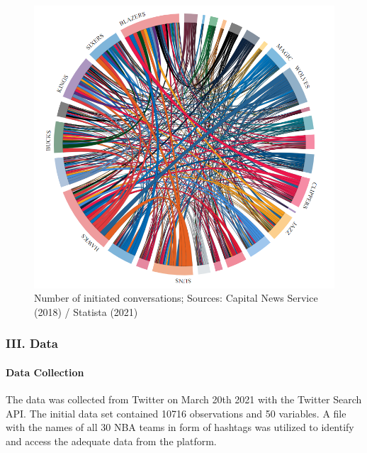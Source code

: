 \documentclass[
]{article}
\begin{document}
\begin{figure}

{\centering \includegraphics[width=11.19in,height=0.4\textheight]{../output/Figure 4 - Relationships & Conversations by official Twitter accounts of NBA teams (Capital News Service 2018)} 

}

\caption{Number of initiated conversations; Sources: Capital News Service (2018) / Statista (2021)}\label{fig:unnamed-chunk-4}
\end{figure}

\hfill\break

\hypertarget{iii.-data}{%
\subsubsection{III. Data}\label{iii.-data}}

\hypertarget{data-collection}{%
\paragraph{Data Collection}\label{data-collection}}

The data was collected from Twitter on March 20th 2021 with the Twitter
Search API. The initial data set contained 10716 observations and 50
variables. A file with the names of all 30 NBA teams in form of hashtags
was utilized to identify and access the adequate data from the platform.
\end{document}
